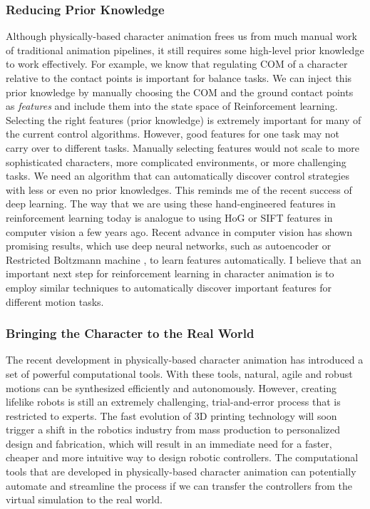 \subsubsection{Reducing Prior Knowledge}

Although physically-based character animation frees us from much manual work of traditional animation pipelines, it still requires some high-level prior knowledge to work effectively. For example, we know that regulating COM of a character relative to the contact points is important for balance tasks. We can inject this prior knowledge by manually choosing the COM and the ground contact points as \emph{features} and include them into the state space of Reinforcement learning. Selecting the right features (prior knowledge) is extremely important for many of the current control algorithms. However, good features for one task may not carry over to different tasks. Manually selecting features would not scale to more sophisticated characters, more complicated environments, or more challenging tasks. We need an algorithm that can automatically discover control strategies with less or even no prior knowledges. This reminds me of the recent success of deep learning. The way that we are using these hand-engineered features in reinforcement learning today is analogue to using HoG or SIFT features in computer vision a few years ago. Recent advance in computer vision has shown promising results, which use deep neural networks, such as autoencoder \cite{Vincent:2008} or Restricted Boltzmann machine \cite{Hinton:2012}, to learn features automatically. I believe that an important next step for reinforcement learning in character animation is to employ similar techniques to automatically discover important features for different motion tasks.

\subsubsection{Bringing the Character to the Real World}

The recent development in physically-based character animation has introduced a set of powerful computational tools. With these tools, natural, agile and robust motions can be synthesized efficiently and autonomously. However, creating lifelike robots is still an extremely challenging, trial-and-error process that is restricted to experts. The fast evolution of 3D printing technology will soon trigger a shift in the robotics industry from mass production to personalized design and fabrication, which will result in an immediate need for a faster, cheaper and more intuitive way to design robotic controllers. The computational tools that are developed in physically-based character animation can potentially automate and streamline the process if we can transfer the controllers from the virtual simulation to the real world. 

